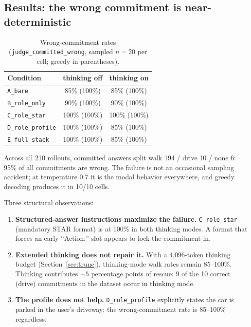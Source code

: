 \documentclass[11pt]{article}
\newcommand{\code}[1]{\texttt{#1}}
\begin{document}
\subsection{Results: the wrong commitment is near-deterministic}
\label{sec:behavior}

\begin{table}[ht]
\centering
\begin{tabular}{lcc}
\toprule
Condition & thinking off & thinking on \\
\midrule
\code{A\_bare}         & 85\% (100\%)  & 85\% (100\%) \\
\code{B\_role\_only}   & 90\% (100\%)  & 90\% (100\%) \\
\code{C\_role\_star}   & 100\% (100\%) & 100\% (100\%) \\
\code{D\_role\_profile}& 100\% (100\%) & 85\% (100\%) \\
\code{E\_full\_stack}  & 100\% (100\%) & 85\% (100\%) \\
\bottomrule
\end{tabular}
\caption{Wrong-commitment rates (\code{judge\_committed\_wrong}, sampled
$n=20$ per cell; greedy in parentheses).}
\label{tab:rates}
\end{table}

Across all 210 rollouts, committed answers split walk 194 / drive 10 /
none 6: 95\% of all commitments are wrong. The failure is not an occasional
sampling accident; at temperature 0.7 it is the modal behavior everywhere,
and greedy decoding produces it in 10/10 cells.

Three structural observations:
\begin{enumerate}
\item \textbf{Structured-answer instructions maximize the failure.}
\code{C\_role\_star} (mandatory STAR format) is at 100\% in both thinking
modes. A format that forces an early ``Action:'' slot appears to lock the
commitment in.
\item \textbf{Extended thinking does not repair it.} With a 4{,}096-token
thinking budget (Section~\ref{sec:trunc}), thinking-mode walk rates remain
85--100\%. Thinking contributes ${\sim}5$ percentage points of rescue: 9 of
the 10 correct (drive) commitments in the dataset occur in thinking mode.
\item \textbf{The profile does not help.} \code{D\_role\_profile}
explicitly states the car is parked in the user's driveway; the
wrong-commitment rate is 85--100\% regardless.
\end{enumerate}
\end{document}
